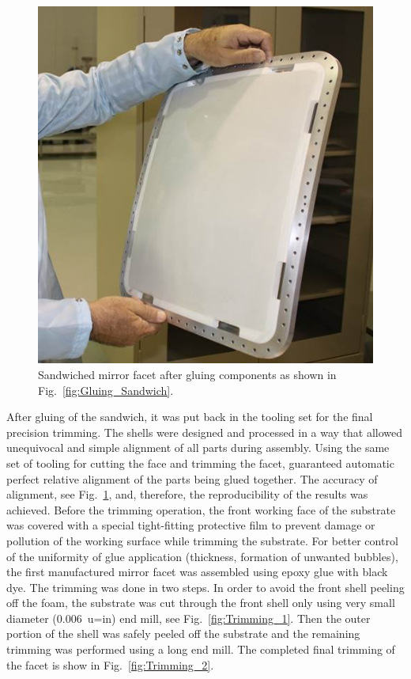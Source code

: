 \begin{figure}[ht]
    \centering
    \includegraphics[width=0.9\linewidth]{images/Assembled_Sandwich.jpg}
    \caption{Sandwiched mirror facet after gluing components as shown in Fig.~\ref{fig:Gluing_Sandwich}.}
    \label{fig:Assembled_Sandwich}
\end{figure}

After gluing of the sandwich, it was put back in the tooling set for the final precision trimming. The shells were
designed and processed in a way that allowed  unequivocal and simple alignment of all parts during assembly. Using
the same set of tooling for cutting the face and trimming the facet, guaranteed automatic perfect relative
alignment of the parts being glued together. The accuracy of alignment, see Fig.~\ref{fig:Assembled_Sandwich},
and, therefore, the reproducibility of the results was achieved. Before the trimming operation, the front working
face of the substrate was covered with a special tight-fitting protective film to prevent damage or pollution of the
working surface while trimming the substrate. For better control of the uniformity of glue application (thickness,
formation of unwanted bubbles), the first manufactured mirror facet was assembled using epoxy glue with black
dye. The trimming was done in two steps. In order to avoid the front shell peeling off the foam, the substrate  was
cut through the front shell only using very small diameter (0.006~u=in) end mill, see Fig.~\ref{fig:Trimming_1}. Then
the outer portion of the shell was safely peeled off the substrate and the remaining trimming was performed using
a long end mill. The completed final trimming of the facet is show in Fig.~\ref{fig:Trimming_2}.


